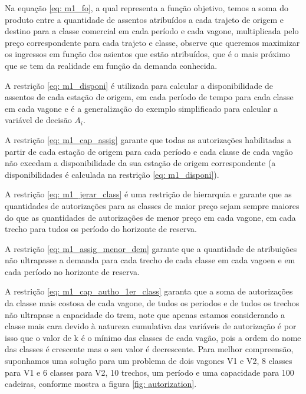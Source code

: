 Na equação \ref{eq: m1_fo}, a qual representa a função objetivo, temos a soma do produto entre a quantidade de assentos atribuídos a cada trajeto de origem e destino para a classe comercial em cada período e cada vagone, multiplicada pelo preço correspondente para cada trajeto e classe, observe que queremos maximizar os ingressos em função dos asientos que estão atribuídos, que é o mais próximo que se tem da realidade em função da demanda conhecida.

A restrição \ref{eq: m1_disponi} é utilizada para calcular a disponibilidade de assentos de cada estação de origem, em cada período de tempo para cada classe em cada vagone e é a generalização do exemplo simplificado para calcular a variável de decisão $A_i$.

A restrição \ref{eq: m1_cap_assig} garante que todas as autorizações habilitadas a partir de cada estação de origem para cada período e cada classe de cada vagão não excedam a disponibilidade da sua estação de origem correspondente (a disponibilidades é calculada na restrição \ref{eq: m1_disponi}).

A restrição \ref{eq: m1_jerar_class} é uma restrição de hierarquia e garante que as quantidades de autorizações para as classes de maior preço sejam sempre maiores do que as quantidades de autorizações de menor preço em cada vagone, em cada trecho para tudos os período do horizonte de reserva.

A restrição \ref{eq: m1_assig_menor_dem} garante que a quantidade de atribuições não ultrapasse a demanda para cada trecho de cada classe em cada vagoen e em cada período no horizonte de reserva.

A restrição \ref{eq: m1_cap_autho_1er_class} garanta que a soma de autorizações da classe mais costosa de cada vagone, de tudos os periodos e de tudos os trechos não ultrapase a capacidade do trem, note que apenas estamos considerando a classe mais cara devido à natureza cumulativa das variáveis de autorização é por isso que o valor de k é o mínimo das classes de cada vagão, pois a ordem do nome das classes é crescente mas o seu valor é decrescente. Para melhor compreensão, suponhamos uma solução para um problema de dois vagones V1 e V2, 8 classes para V1 e 6 classes para V2, 10 trechos, um período e uma capacidade para 100 cadeiras, conforme mostra a figura \ref{fig: autorization}.

